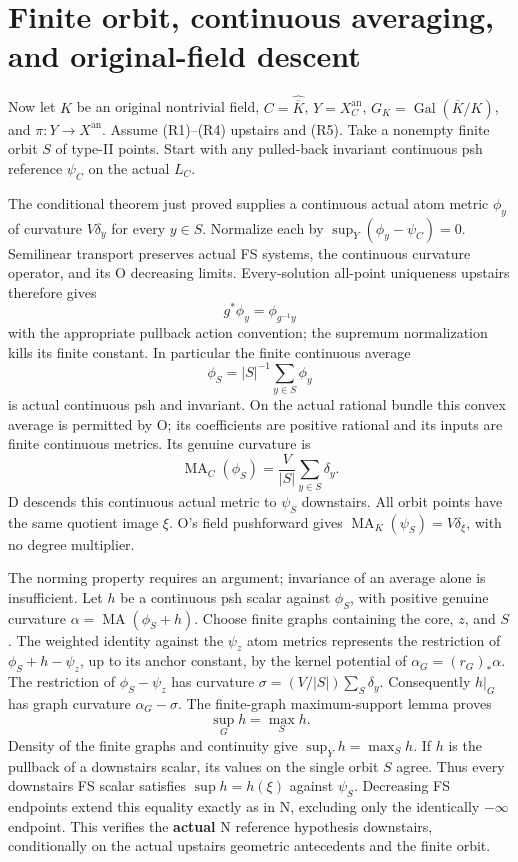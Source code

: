 \documentclass[
  11pt,
]{article}
\begin{document}
\section{Finite orbit, continuous averaging, and original-field
descent}\label{finite-orbit-continuous-averaging-and-original-field-descent}

Now let \(K\) be an original nontrivial field,
\(C=\widehat{\overline K}\), \(Y=X_C^{\mathrm{an}}\),
\(G_K=\operatorname{Gal}(\overline K/K)\), and
\(\pi:Y\to X^{\mathrm{an}}\). Assume (R1)--(R4) upstairs and (R5). Take
a nonempty finite orbit \(S\) of type-II points. Start with any
pulled-back invariant continuous psh reference \(\psi_C\) on the actual
\(L_C\).

The conditional theorem just proved supplies a continuous actual atom
metric \(\phi_y\) of curvature \(V\delta_y\) for every \(y\in S\).
Normalize each by \(\sup_Y(\phi_y-\psi_C)=0\). Semilinear transport
preserves actual FS systems, the continuous curvature operator, and its
O decreasing limits. Every-solution all-point uniqueness upstairs
therefore gives \[
 g^*\phi_y=\phi_{g^{-1}y}
\] with the appropriate pullback action convention; the supremum
normalization kills its finite constant. In particular the finite
continuous average \[
 \phi_S=|S|^{-1}\sum_{y\in S}\phi_y
\] is actual continuous psh and invariant. On the actual rational bundle
this convex average is permitted by O; its coefficients are positive
rational and its inputs are finite continuous metrics. Its genuine
curvature is \[
 \operatorname{MA}_C(\phi_S)=\frac{V}{|S|}\sum_{y\in S}\delta_y.
\] D descends this continuous actual metric to \(\psi_S\) downstairs.
All orbit points have the same quotient image \(\xi\). O's field
pushforward gives \(\operatorname{MA}_K(\psi_S)=V\delta_\xi\), with no
degree multiplier.

The norming property requires an argument; invariance of an average
alone is insufficient. Let \(h\) be a continuous psh scalar against
\(\phi_S\), with positive genuine curvature
\(\alpha=\operatorname{MA}(\phi_S+h)\). Choose finite graphs containing
the core, \(z\), and \(S\). The weighted identity against the \(\psi_z\)
atom metrics represents the restriction of \(\phi_S+h-\psi_z\), up to
its anchor constant, by the kernel potential of
\(\alpha_G=(r_G)_*\alpha\). The restriction of \(\phi_S-\psi_z\) has
curvature \(\sigma=(V/|S|)\sum_S\delta_y\). Consequently \(h|_G\) has
graph curvature \(\alpha_G-\sigma\). The finite-graph maximum-support
lemma proves \[
 \sup_G h=\max_S h.
\] Density of the finite graphs and continuity give \(\sup_Yh=\max_Sh\).
If \(h\) is the pullback of a downstairs scalar, its values on the
single orbit \(S\) agree. Thus every downstairs FS scalar satisfies
\(\sup h=h(\xi)\) against \(\psi_S\). Decreasing FS endpoints extend
this equality exactly as in N, excluding only the identically
\(-\infty\) endpoint. This verifies the \textbf{actual} N reference
hypothesis downstairs, conditionally on the actual upstairs geometric
antecedents and the finite orbit.
\end{document}
